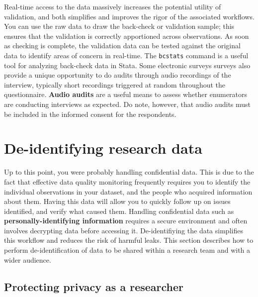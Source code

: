 Real-time access to the data massively increases the potential utility of validation,
and both simplifies and improves the rigor of the associated workflows.
You can use the raw data to draw the back-check or validation sample;
this ensures that the validation is correctly apportioned across observations.
As soon as checking is complete, the validation data can be tested against
the original data to identify areas of concern in real-time.
The \texttt{bcstats} command is a useful tool for analyzing back-check data in Stata.
Some electronic surveys surveys also provide a unique opportunity
to do audits through audio recordings of the interview,
typically short recordings triggered at random throughout the questionnaire.
\textbf{Audio audits} are a useful means to assess whether enumerators are conducting interviews as expected.
Do note, however, that audio audits must be included in the informed consent for the respondents.


\section{De-identifying research data}

Up to this point, you were probably handling confidential data.
This is due to the fact that effective data quality monitoring
frequently requires you to identify the individual observations in your dataset,
and the people who acquired information about them.
Having this data will allow you to quickly follow up on issues identified,
and verify what caused them.
Handling confidential data such as \textbf{personally-identifying information}
requires a secure environment and often involves
decrypting data before accessing it.
De-identifiying the data simplifies this workflow and reduces the risk of harmful leaks.
This section describes how to perform de-identification of data 
to be shared within a research team and with a wider audience.

\subsection{Protecting privacy as a researcher}


